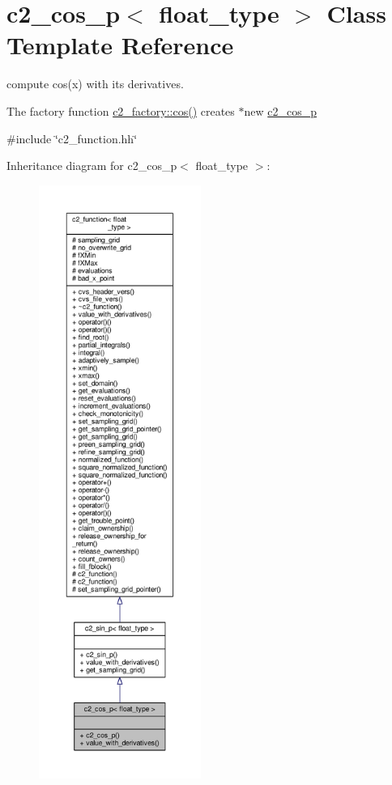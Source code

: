 \hypertarget{classc2__cos__p}{}\section{c2\+\_\+cos\+\_\+p$<$ float\+\_\+type $>$ Class Template Reference}
\label{classc2__cos__p}


compute cos(x) with its derivatives.

The factory function \hyperlink{classc2__factory_abc5ea51417ecef590629a39f7a2227e4}{c2\+\_\+factory\+::cos()} creates $\ast$new \hyperlink{classc2__cos__p}{c2\+\_\+cos\+\_\+p}  




{\ttfamily \#include \char`\"{}c2\+\_\+function.\+hh\char`\"{}}



Inheritance diagram for c2\+\_\+cos\+\_\+p$<$ float\+\_\+type $>$\+:
\nopagebreak
\begin{figure}[H]
\begin{center}
\leavevmode
\includegraphics[height=550pt]{classc2__cos__p__inherit__graph}
\end{center}
\end{figure}


